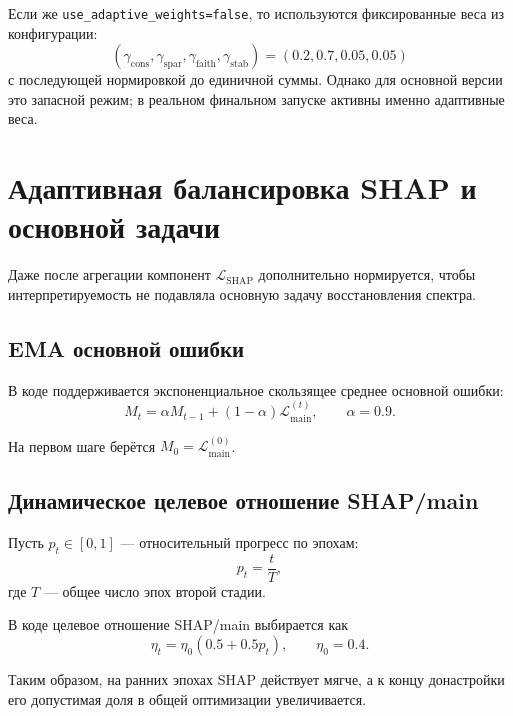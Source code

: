 \documentclass[11pt]{article}
\begin{document}
Если же \texttt{use\_adaptive\_weights=false}, то используются фиксированные веса из конфигурации:
\begin{equation}
(\gamma_{\mathrm{cons}}, \gamma_{\mathrm{spar}}, \gamma_{\mathrm{faith}}, \gamma_{\mathrm{stab}})
= (0.2, 0.7, 0.05, 0.05)
\end{equation}
с последующей нормировкой до единичной суммы. Однако для основной версии это запасной режим; в реальном финальном запуске активны именно адаптивные веса.

\section{Адаптивная балансировка SHAP и основной задачи}

Даже после агрегации компонент $\mathcal{L}_{\mathrm{SHAP}}$ дополнительно нормируется, чтобы интерпретируемость не подавляла основную задачу восстановления спектра.

\subsection{EMA основной ошибки}

В коде поддерживается экспоненциальное скользящее среднее основной ошибки:
\begin{equation}
M_t = \alpha M_{t-1} + (1-\alpha)\mathcal{L}_{\mathrm{main}}^{(t)},
\qquad
\alpha = 0.9.
\end{equation}

На первом шаге берётся $M_0 = \mathcal{L}_{\mathrm{main}}^{(0)}$.

\subsection{Динамическое целевое отношение SHAP/main}

Пусть $p_t \in [0,1]$ --- относительный прогресс по эпохам:
\begin{equation}
 p_t = \frac{t}{T},
\end{equation}
где $T$ --- общее число эпох второй стадии.

В коде целевое отношение SHAP/main выбирается как
\begin{equation}
\eta_t = \eta_0 (0.5 + 0.5 p_t),
\qquad
\eta_0 = 0.4.
\end{equation}

Таким образом, на ранних эпохах SHAP действует мягче, а к концу донастройки его допустимая доля в общей оптимизации увеличивается.
\end{document}
